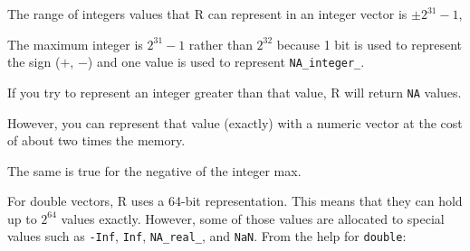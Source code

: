 \documentclass[]{book}
\newenvironment{Shaded}{\begin{snugshade}}{\end{snugshade}}
\newcommand{\CommentTok}[1]{\textcolor[rgb]{0.56,0.35,0.01}{\textit{#1}}}
\newcommand{\DecValTok}[1]{\textcolor[rgb]{0.00,0.00,0.81}{#1}}
\newcommand{\KeywordTok}[1]{\textcolor[rgb]{0.13,0.29,0.53}{\textbf{#1}}}
\newcommand{\NormalTok}[1]{#1}
\newcommand{\OperatorTok}[1]{\textcolor[rgb]{0.81,0.36,0.00}{\textbf{#1}}}
\newcommand{\StringTok}[1]{\textcolor[rgb]{0.31,0.60,0.02}{#1}}
\theoremstyle{plain}
\theoremstyle{remark}
\begin{document}
The range of integers values that R can represent in an integer vector is \(\pm 2^{31} - 1\),

\begin{Shaded}
\end{Shaded}

The maximum integer is \(2^{31} - 1\) rather than \(2^{32}\) because 1 bit is used to
represent the sign (\(+\), \(-\)) and one value is used to represent \texttt{NA\_integer\_}.

If you try to represent an integer greater than that value, R will return \texttt{NA} values.

\begin{Shaded}
\end{Shaded}

However, you can represent that value (exactly) with a numeric vector at the cost of
about two times the memory.

\begin{Shaded}
\end{Shaded}

The same is true for the negative of the integer max.

\begin{Shaded}
\end{Shaded}

For double vectors, R uses a 64-bit representation. This means that they can hold up
to \(2^{64}\) values exactly. However, some of those values are allocated to special values
such as \texttt{-Inf}, \texttt{Inf}, \texttt{NA\_real\_}, and \texttt{NaN}. From the help for \texttt{double}:
\end{document}
